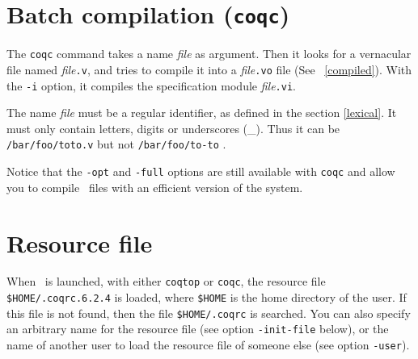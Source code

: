 \section{Batch compilation ({\tt coqc})}
The {\tt coqc} command takes a name {\em file} as argument.  Then it
looks for a vernacular file named {\em file}{\tt .v}, and tries to
compile it into a {\em file}{\tt .vo} file (See ~\ref{compiled}).
With the \verb!-i! option, it compiles the specification module {\em
file}{\tt .vi}. 

\Warning The name {\em file} must be a regular {\Coq} identifier, as
defined in the section \ref{lexical}. It
must only contain letters, digits or underscores
(\_). Thus it can be \verb+/bar/foo/toto.v+ but not 
\verb+/bar/foo/to-to+ . 

Notice that the \verb!-opt! and \verb!-full! options are still
available with \verb!coqc!  and allow you to compile \Coq\ files with
an efficient version of the system.


\section{Resource file}

When \Coq\ is launched, with either {\tt coqtop} or {\tt coqc}, the
resource file \verb:$HOME/.coqrc.6.2.4: is loaded, where \verb:$HOME: is
the home directory of the user.  If this file is not found, then the
file \verb:$HOME/.coqrc: is searched. You can also specify an
arbitrary name for the resource file (see option \verb:-init-file:
below), or the name of another user to load the resource file of
someone else (see option \verb:-user:).

